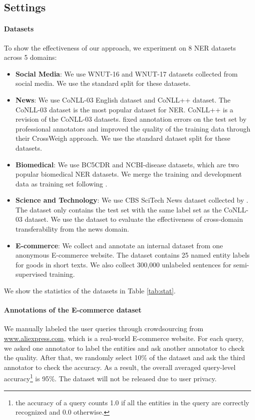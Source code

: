 \documentclass[11pt,a4paper]{article}
\begin{document}
\subsection{Settings}
\paragraph{Datasets} To show the effectiveness of our approach, we experiment on 8 NER datasets across 5 domains:
\begin{itemize}[leftmargin=*]
    \item {\bf Social Media}: We use WNUT-16 \citep{strauss-etal-2016-results} and WNUT-17 \citep{derczynski-etal-2017-results} datasets collected from social media. We use the standard split for these datasets.
    \item {\bf News}: We use CoNLL-03 English \cite{tjong-kim-sang-de-meulder-2003-introduction} dataset and CoNLL++ \citep{wang-etal-2019-crossweigh} dataset. The CoNLL-03 dataset is the most popular dataset for NER. CoNLL++ is a revision of the CoNLL-03 datasets. \citet{wang-etal-2019-crossweigh} fixed annotation errors on the test set by professional annotators and improved the quality of the training data through their CrossWeigh approach. We use the standard dataset split for these datasets.
    \item {\bf Biomedical}: We use BC5CDR \citep{li2016biocreative} and NCBI-disease \citep{dougan2014ncbi} datasets, which are two popular biomedical NER datasets. We merge the training and development data as training set following \citet{nooralahzadeh-etal-2019-reinforcement}.
    \item {\bf Science and Technology}: We use CBS SciTech News dataset collected by \citet{jia-etal-2019-cross}. The dataset only contains the test set with the same label set as the CoNLL-03 dataset. We use the dataset to evaluate the effectiveness of cross-domain transferability from the news domain.
    \item {\bf E-commerce}: %
    We collect and annotate an internal dataset from one anonymous E-commerce website. The dataset contains 25 named entity labels for goods in short texts. We also collect 300,000 unlabeled sentences for semi-supervised training.
\end{itemize}
We show the statistics of the datasets in Table \ref{tab:stat}.

\paragraph{Annotations of the E-commerce dataset}
We manually labeled the user queries through crowdsourcing from \url{www.aliexpress.com}, which is a real-world E-commerce website. For each query, we asked one annotator to label the entities and ask another annotator to check the quality. After that, we randomly select 10\% of the dataset and ask the third annotator to check the accuracy. As a result, the overall averaged query-level accuracy\footnote{the accuracy of a query counts 1.0 if all the entities in the query are correctly recognized and 0.0 otherwise.} is 95\%. The dataset will not be released due to user privacy.
\end{document}

